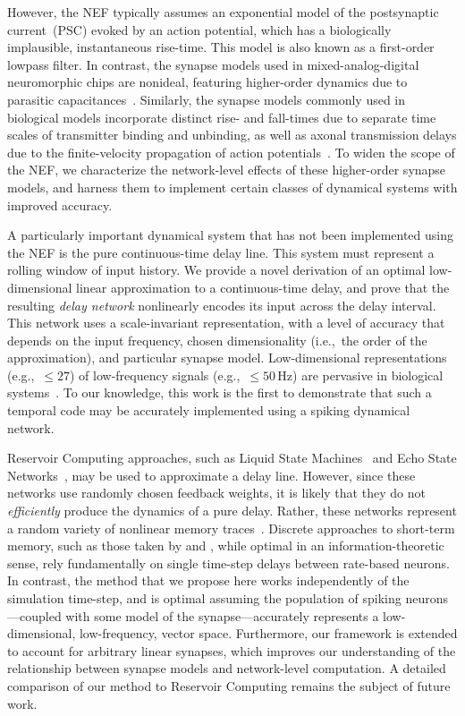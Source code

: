 \documentclass[12pt]{article}
\theoremstyle{definition}
\begin{document}
However, the NEF typically assumes an exponential model of the postsynaptic current~(PSC) evoked by an action potential, which has a biologically implausible, instantaneous rise-time.
This model is also known as a first-order lowpass filter.
In contrast, the synapse models used in mixed-analog-digital neuromorphic chips are nonideal, featuring higher-order dynamics due to parasitic capacitances~\citep{voelker2017iscas}.
Similarly, the synapse models commonly used in biological models incorporate distinct rise- and fall-times due to separate time scales of transmitter binding and unbinding, as well as axonal transmission delays due to the finite-velocity propagation of action potentials~\citep{roth2009modeling}.
To widen the scope of the NEF, we characterize the network-level effects of these higher-order synapse models, and harness them to implement certain classes of dynamical systems with improved accuracy.

A particularly important dynamical system that has not been implemented using the NEF is the pure continuous-time delay line.
This system must represent a rolling window of input history.
We provide a novel derivation of an optimal low-dimensional linear approximation to a continuous-time delay, and prove that the resulting \emph{delay network} nonlinearly encodes its input across the delay interval.
This network uses a scale-invariant representation, with a level of accuracy that depends on the input frequency, chosen dimensionality (i.e.,~the order of the approximation), and particular synapse model.
Low-dimensional representations (e.g.,~$\le 27$) of low-frequency signals (e.g.,~$\le 50$\,Hz) are pervasive in biological systems~\citep{cunningham2014dimensionality, waernberg2017low, pulvermuller1997high, singer1999neuronal}.
To our knowledge, this work is the first to demonstrate that such a temporal code may be accurately implemented using a spiking dynamical network.

Reservoir Computing approaches, such as Liquid State Machines~\citep{maass2002real} and Echo State Networks~\citep{jaeger2001echo}, may be used to approximate a delay line.
However, since these networks use randomly chosen feedback weights, it is likely that they do not {\it efficiently} produce the dynamics of a pure delay.
Rather, these networks represent a random variety of nonlinear memory traces~\citep{lukovsevicius2012reservoir}.
Discrete approaches to short-term memory, such as those taken by \citet{white2004short} and \citet{ganguli2008memory}, while optimal in an information-theoretic sense, rely fundamentally on single time-step delays between rate-based neurons.
In contrast, the method that we propose here works independently of the simulation time-step, and is optimal assuming the population of spiking neurons---coupled with some model of the synapse---accurately represents a low-dimensional, low-frequency, vector space.
Furthermore, our framework is extended to account for arbitrary linear synapses, which improves our understanding of the relationship between synapse models and network-level computation.
A detailed comparison of our method to Reservoir Computing remains the subject of future work.
\end{document}
